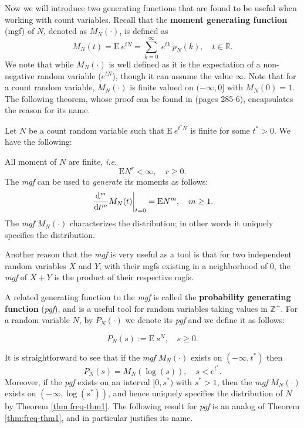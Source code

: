 \documentclass[]{book}
\theoremstyle{definition}
\theoremstyle{definition}
\theoremstyle{definition}
\theoremstyle{remark}
\let\BeginKnitrBlock\begin \let\EndKnitrBlock\end
\begin{document}
Now we will introduce two generating functions that are found to be
useful when working with count variables. Recall that the \textbf{moment
generating function} (mgf) of \(N\), denoted as \(M_N(\cdot)\), is
defined as \[
M_N(t) = \mathrm{E}~{e^{tN}} = \sum^{\infty}_{k=0} ~e^{tk}~ p_N(k), \quad t\in \mathbb{R}.
\] We note that while \(M_N(\cdot)\) is well defined as it is the
expectation of a non-negative random variable (\(e^{tN}\)), though it
can assume the value \(\infty\). Note that for a count random variable,
\(M_N(\cdot)\) is finite valued on \((-\infty,0]\) with \(M_N(0)=1\).
The following theorem, whose proof can be found in \citep{billingsley}
(pages 285-6), encapsulates the reason for its name.

\BeginKnitrBlock{theorem}
\protect\hypertarget{thm:freq-thm1}{}{\label{thm:freq-thm1} }Let \(N\) be a
count random variable such that \(\mathrm{E}~{e^{t^\ast N}}\) is finite
for some \(t^\ast>0\). We have the following:

All moment of \(N\) are finite, \emph{i.e.} \[
\mathrm{E}{N^r}<\infty, \quad r\geq 0.
\] The \emph{mgf} can be used to \emph{generate} its moments as follows:
\[
\left.\frac{{\rm d}^m}{{\rm d}t^m} M_N(t)\right\vert_{t=0}=\mathrm{E}{N^m}, \quad m\geq 1.
\] The \emph{mgf} \(M_N(\cdot)\) characterizes the distribution; in
other words it uniquely specifies the distribution.
\EndKnitrBlock{theorem}

Another reason that the \emph{mgf} is very useful as a tool is that for
two independent random variables \(X\) and \(Y\), with their mgfs
existing in a neighborhood of \(0\), the \emph{mgf} of \(X+Y\) is the
product of their respective mgfs.

A related generating function to the \emph{mgf} is called the
\textbf{probability generating function} (\emph{pgf}), and is a useful
tool for random variables taking values in \(\mathbb{Z}^+\). For a
random variable \(N\), by \(P_N(\cdot)\) we denote its \emph{pgf} and we
define it as follows:

\begin{equation}
P_N(s):=\mathrm{E}~{s^N}, \quad s\geq 0.
\end{equation}

It is straightforward to see that if the \emph{mgf} \(M_N(\cdot)\)
exists on \((-\infty,t^\ast)\) then \[
P_N(s)=M_N(\log(s)), \quad s<e^{t^\ast}.
\] Moreover, if the \emph{pgf} exists on an interval \([0,s^\ast)\) with
\(s^\ast>1\), then the \emph{mgf} \(M_N(\cdot)\) exists on
\((-\infty,\log(s^\ast))\), and hence uniquely specifies the
distribution of \(N\) by Theorem \ref{thm:freq-thm1}. The following
result for \emph{pgf} is an analog of Theorem \ref{thm:freq-thm1}, and
in particular justifies its name.
\end{document}
